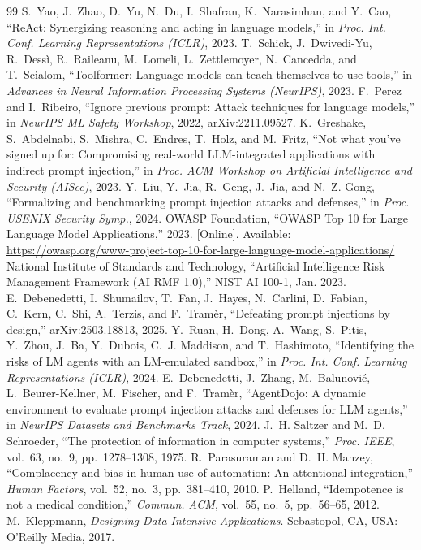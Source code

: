 \documentclass[conference]{IEEEtran}
\begin{document}
\begin{thebibliography}{99}
 S.~Yao, J.~Zhao, D.~Yu, N.~Du, I.~Shafran, K.~Narasimhan, and Y.~Cao, ``ReAct: Synergizing reasoning and acting in language models,'' in \emph{Proc. Int. Conf. Learning Representations (ICLR)}, 2023.
 T.~Schick, J.~Dwivedi-Yu, R.~Dess\`{i}, R.~Raileanu, M.~Lomeli, L.~Zettlemoyer, N.~Cancedda, and T.~Scialom, ``Toolformer: Language models can teach themselves to use tools,'' in \emph{Advances in Neural Information Processing Systems (NeurIPS)}, 2023.
 F.~Perez and I.~Ribeiro, ``Ignore previous prompt: Attack techniques for language models,'' in \emph{NeurIPS ML Safety Workshop}, 2022, arXiv:2211.09527.
 K.~Greshake, S.~Abdelnabi, S.~Mishra, C.~Endres, T.~Holz, and M.~Fritz, ``Not what you've signed up for: Compromising real-world LLM-integrated applications with indirect prompt injection,'' in \emph{Proc. ACM Workshop on Artificial Intelligence and Security (AISec)}, 2023.
 Y.~Liu, Y.~Jia, R.~Geng, J.~Jia, and N.~Z. Gong, ``Formalizing and benchmarking prompt injection attacks and defenses,'' in \emph{Proc. USENIX Security Symp.}, 2024.
 OWASP Foundation, ``OWASP Top 10 for Large Language Model Applications,'' 2023. [Online]. Available: \url{https://owasp.org/www-project-top-10-for-large-language-model-applications/}
 National Institute of Standards and Technology, ``Artificial Intelligence Risk Management Framework (AI RMF 1.0),'' NIST AI 100-1, Jan. 2023.
 E.~Debenedetti, I.~Shumailov, T.~Fan, J.~Hayes, N.~Carlini, D.~Fabian, C.~Kern, C.~Shi, A.~Terzis, and F.~Tram\`{e}r, ``Defeating prompt injections by design,'' arXiv:2503.18813, 2025.
 Y.~Ruan, H.~Dong, A.~Wang, S.~Pitis, Y.~Zhou, J.~Ba, Y.~Dubois, C.~J. Maddison, and T.~Hashimoto, ``Identifying the risks of LM agents with an LM-emulated sandbox,'' in \emph{Proc. Int. Conf. Learning Representations (ICLR)}, 2024.
 E.~Debenedetti, J.~Zhang, M.~Balunovi\'{c}, L.~Beurer-Kellner, M.~Fischer, and F.~Tram\`{e}r, ``AgentDojo: A dynamic environment to evaluate prompt injection attacks and defenses for LLM agents,'' in \emph{NeurIPS Datasets and Benchmarks Track}, 2024.
 J.~H. Saltzer and M.~D. Schroeder, ``The protection of information in computer systems,'' \emph{Proc. IEEE}, vol.~63, no.~9, pp.~1278--1308, 1975.
 R.~Parasuraman and D.~H. Manzey, ``Complacency and bias in human use of automation: An attentional integration,'' \emph{Human Factors}, vol.~52, no.~3, pp.~381--410, 2010.
 P.~Helland, ``Idempotence is not a medical condition,'' \emph{Commun. ACM}, vol.~55, no.~5, pp.~56--65, 2012.
 M.~Kleppmann, \emph{Designing Data-Intensive Applications}. Sebastopol, CA, USA: O'Reilly Media, 2017.
\end{thebibliography}
\end{document}
